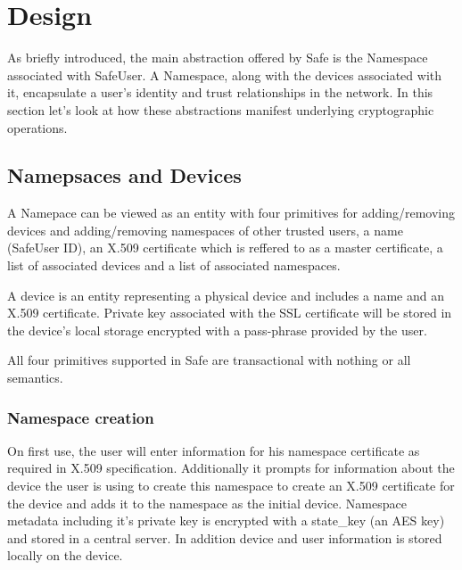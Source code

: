 \section{Design}
\label{sec:design}

As briefly introduced, the main abstraction offered by Safe is the Namespace associated with SafeUser. A Namespace, along with the devices associated with it, encapsulate a user's identity and trust relationships in the network. In this section let's look at how these abstractions manifest underlying cryptographic operations.

\subsection{Namepsaces and Devices}
A Namepace can be viewed as an entity with four primitives for adding/removing devices and adding/removing namespaces of other trusted users, a name (SafeUser ID), an X.509 certificate which is reffered to as a master certificate, a list of associated devices and a list of associated namespaces.

A device is an entity representing a physical device and includes a name and an X.509 certificate. Private key associated with the SSL certificate will be stored in the device's local storage encrypted with a pass-phrase provided by the user.

All four primitives supported in Safe are transactional with nothing or all semantics.

\subsubsection{Namespace creation}
On first use, the user will enter information for his namespace certificate as required in X.509 specification. Additionally it prompts for information about the device the user is using to create this namespace to create an X.509 certificate for the device and adds it to the namespace as the initial device. Namespace metadata including it's private key is encrypted with a state\_key (an AES key) and stored in a central server. In addition device and user information is stored locally on the device. 

